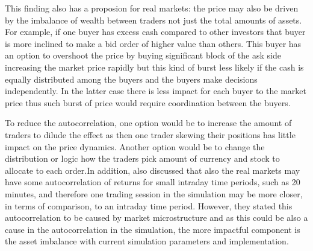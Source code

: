 

This finding also has a proposion for real markets: the price may also be driven by the imbalance of wealth between traders 
not just the total amounts of assets. For example, if one buyer has excess cash compared to other investors that buyer is more 
inclined to make a bid order of higher value than others. This buyer has an option to overshoot the price by buying 
significant block of the ask side increasing the market price rapidly but this kind of burst less likely if the cash 
is equally distributed among the buyers and the buyers make decisions independently. In the latter case there is less
impact for each buyer to the market price thus such burst of price would require coordination between the buyers.

To reduce the autocorrelation, one option would be to increase the amount of traders to dilude the effect as then
one trader skewing their positions has little impact on the price dynamics. Another option would be to change the 
distribution or logic how the traders pick amount of currency and stock to allocate to each order.In addition, 
\citet{StylizedFacts01} also discussed that also the real markets may have some autocorrelation 
of returns for small intraday time periods, such as 20 minutes, and therefore one trading session in the simulation 
may be more closer, in terms of comparison, to an intraday time period. However, they stated this autocorrelation
to be caused by market microstructure and as this could be also a cause in the autocorrelation in the simulation,
the more impactful component is the asset imbalance with current simulation parameters and implementation.
